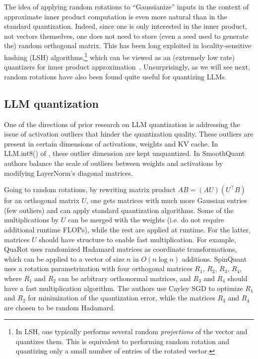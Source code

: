 \documentclass{article}
\theoremstyle{plain}
\theoremstyle{definition}
\theoremstyle{remark}
\begin{document}
The idea of applying random rotations to ``Gaussianize'' inputs in the context of approximate inner product computation is even  more natural than in the standard quantization. Indeed, since one is only interested in the inner product, not vectors themselves, one does not need to store (even a seed used to generate the) random orthogonal matrix. This has been long exploited in locality-sensitive hashing (LSH) algorithms,\footnote{In LSH, one typically performs several random \emph{projections} of the vector and quantizes them. This is equivalent to performing random rotation and quantizing only a small number of entries of the rotated vector.} which can be viewed as an (extremely low rate) quantizers for inner product approximation~\cite{charikar2002similarity,datar2004locality,andoni2008near}. Unsurprisingly, as we will see next,  random rotations have also been found quite useful for quantizing LLMs.


\subsection{LLM quantization}\label{sec:llm_review}

One of the directions of prior research on LLM quantization is addressing the issue of activation outliers that hinder the quantization quality. These outliers are present in certain dimensions of activations, weights and KV cache. In LLM.int8() of \cite{dettmers2022}, these outlier dimension are kept unquantized. In SmoothQuant~\cite{xiao2024} authors balance the scale of outliers between weights and activations by modifying LayerNorm's diagonal matrices.

Going to random rotations, by rewriting matrix product $AB=(AU) (U^\top B)$ for an orthogonal matrix $U$, one gets matrices with much more Gaussian entries (few outliers) and can apply standard quantization algorithms. Some of the multiplications by $U$ can be merged with the weights (i.e. do not require additional runtime FLOPs), while the rest are applied at runtime. For the latter, matrices $U$ should have structure to enable fast multiplication. For example, QuaRot \cite{ashkboos2024} uses randomized Hadamard matrices as coordinate transformations, which can be applied to a vector of size $n$ in $O(n \log n)$ additions. SpinQuant \cite{liu2024} uses a rotation parametrization with four orthogonal matrices $R_1$, $R_2$, $R_3$, $R_4$, where $R_1$ and $R_2$ can be arbitrary orthonormal matrices, and $R_3$ and $R_4$ should have a fast multiplication algorithm. The authors use Cayley SGD \cite{li2020} to optimize $R_1$ and $R_2$ for minimization of the quantization error, while the matrices $R_3$ and $R_4$ are chosen to be random Hadamard. 
\end{document}
